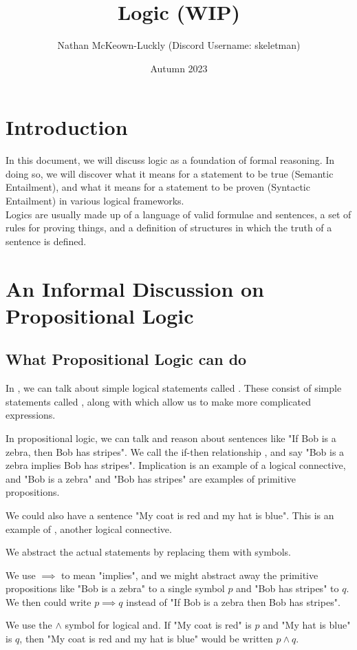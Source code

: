 \documentclass[11pt]{article}
\title{Logic (WIP)}
\date{Autumn 2023}
\author{Nathan McKeown-Luckly (Discord Username: skeletman)}
\begin{document}
\maketitle
\tableofcontents
\pagebreak
\section{Introduction}
In this document, we will discuss logic as a foundation of formal reasoning. In doing so, we will discover what it means for a statement to be true (Semantic Entailment), and what it means for a statement to be proven (Syntactic Entailment) in various logical frameworks.
\\ Logics are usually made up of a language of valid formulae and sentences, a set of rules for proving things, and a definition of structures in which the truth of a sentence is defined.
\section{An Informal Discussion on Propositional Logic}
\subsection{What Propositional Logic can do}
In , we can talk about simple logical statements called . These consist of simple statements called , along with  which allow us to make more complicated expressions.
\begin{eg}
    In propositional logic, we can talk and reason about sentences like "If Bob is a zebra, then Bob has stripes". We call the if-then relationship , and say "Bob is a zebra implies Bob has stripes". Implication is an example of a logical connective, and "Bob is a zebra" and "Bob has stripes" are examples of primitive propositions.
\end{eg}
\begin{eg}
    We could also have a sentence "My coat is red and my hat is blue". This is an example of , another logical connective.
\end{eg}
We abstract the actual statements by replacing them with symbols.
\begin{eg}
    We use $\implies$ to mean "implies", and we might abstract away the primitive propositions like "Bob is a zebra" to a single symbol $p$ and "Bob has stripes" to $q$. We then could write $p \implies q$ instead of "If Bob is a zebra then Bob has stripes".
\end{eg}
\begin{eg}
    We use the $\wedge$ symbol for logical and. If "My coat is red" is $p$ and "My hat is blue" is $q$, then "My coat is red and my hat is blue" would be written $p \wedge q$.
\end{eg}
\pagebreak
\end{document}
